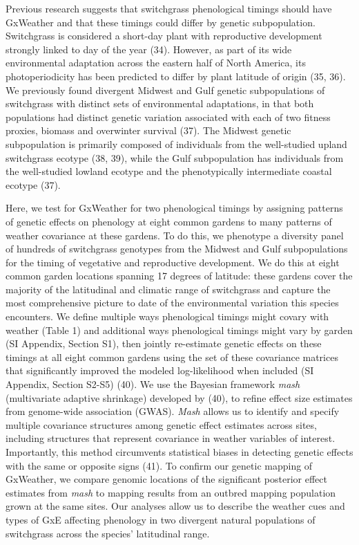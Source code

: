 \documentclass[
  9pt,
  twocolumn,
  twoside]{pnas-new}
\begin{document}
Previous research suggests that switchgrass phenological timings should
have GxWeather and that these timings could differ by genetic
subpopulation. Switchgrass is considered a short-day plant with
reproductive development strongly linked to day of the year (34).
However, as part of its wide environmental adaptation across the eastern
half of North America, its photoperiodicity has been predicted to differ
by plant latitude of origin (35, 36). We previously found divergent
Midwest and Gulf genetic subpopulations of switchgrass with distinct
sets of environmental adaptations, in that both populations had distinct
genetic variation associated with each of two fitness proxies, biomass
and overwinter survival (37). The Midwest genetic subpopulation is
primarily composed of individuals from the well-studied upland
switchgrass ecotype (38, 39), while the Gulf subpopulation has
individuals from the well-studied lowland ecotype and the phenotypically
intermediate coastal ecotype (37).

Here, we test for GxWeather for two phenological timings by assigning
patterns of genetic effects on phenology at eight common gardens to many
patterns of weather covariance at these gardens. To do this, we
phenotype a diversity panel of hundreds of switchgrass genotypes from
the Midwest and Gulf subpopulations for the timing of vegetative and
reproductive development. We do this at eight common garden locations
spanning 17 degrees of latitude: these gardens cover the majority of the
latitudinal and climatic range of switchgrass and capture the most
comprehensive picture to date of the environmental variation this
species encounters. We define multiple ways phenological timings might
covary with weather (Table 1) and additional ways phenological timings
might vary by garden (SI Appendix, Section S1), then jointly re-estimate
genetic effects on these timings at all eight common gardens using the
set of these covariance matrices that significantly improved the modeled
log-likelihood when included (SI Appendix, Section S2-S5) (40). We use
the Bayesian framework \emph{mash} (multivariate adaptive shrinkage)
developed by (40), to refine effect size estimates from genome-wide
association (GWAS). \emph{Mash} allows us to identify and specify
multiple covariance structures among genetic effect estimates across
sites, including structures that represent covariance in weather
variables of interest. Importantly, this method circumvents statistical
biases in detecting genetic effects with the same or opposite signs
(41). To confirm our genetic mapping of GxWeather, we compare genomic
locations of the significant posterior effect estimates from \emph{mash}
to mapping results from an outbred mapping population grown at the same
sites. Our analyses allow us to describe the weather cues and types of
GxE affecting phenology in two divergent natural populations of
switchgrass across the species' latitudinal range.
\end{document}
